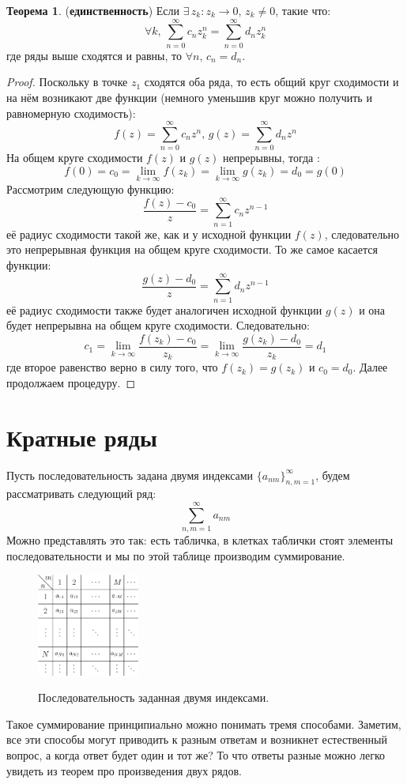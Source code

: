 \documentclass[12pt]{article}
\theoremstyle{definition}
\newtheorem{theorem}{Теорема}
\newcommand{\ddsum}[2]{\displaystyle\sum\limits_{#1}^{#2}}
\begin{document}
\begin{theorem}(\textbf{единственность})
	Если $\exists \, z_k \colon  z_k \to 0, \, z_k \neq 0$, такие что:
	$$
		\forall k, \, \ddsum{n = 0}{\infty}c_n z_k^n = \ddsum{n = 0}{\infty}d_n z_k^n
	$$ 
	где ряды выше сходятся и равны, то $\forall n, \, c_n = d_n$.
\end{theorem}
\begin{proof}
	Поскольку в точке $z_1$ сходятся оба ряда, то есть общий круг сходимости и на нём возникают две функции (немного уменьшив круг можно получить и равномерную сходимость):
	$$
		f(z) = \ddsum{n = 0}{\infty}c_n z^n, \, g(z) = \ddsum{n = 0}{\infty}d_n z^n
	$$
	На общем круге сходимости $f(z)$ и $g(z)$ непрерывны, тогда : 
	$$
		f(0) = c_0 = \lim\limits_{k \to \infty}f(z_k) = \lim\limits_{k \to \infty}g(z_k) = d_0 = g(0)
	$$
	Рассмотрим следующую функцию:
	$$
		\dfrac{f(z) - c_0}{z} = \ddsum{n = 1}{\infty}c_nz^{n-1}
	$$ 
	её радиус сходимости такой же, как и у исходной функции $f(z)$, следовательно это непрерывная функция на общем круге сходимости. То же самое касается функции:
	$$
		\dfrac{g(z) - d_0}{z} = \ddsum{n = 1}{\infty}d_n z^{n-1}
	$$
	её радиус сходимости также будет аналогичен исходной функции $g(z)$ и она будет непрерывна на общем круге сходимости. Следовательно:
	$$
		c_1 = \lim\limits_{k \to \infty}\dfrac{f(z_k) - c_0}{z_k} = \lim\limits_{k \to \infty}\dfrac{g(z_k) - d_0}{z_k} = d_1
	$$
	где второе равенство верно в силу того, что $f(z_k) = g(z_k)$ и $c_0 = d_0$. Далее продолжаем процедуру. 
\end{proof}
\newpage
\section*{Кратные ряды}
Пусть последовательность задана двумя индексами $\{a_{nm}\}_{n,m = 1}^{\infty}$, будем рассматривать следующий ряд:
$$
	\ddsum{n,m = 1}{\infty}a_{nm}
$$
Можно представлять это так: есть табличка, в клетках таблички стоят элементы последовательности и мы по этой таблице производим суммирование.
\begin{figure}[H]
	\centering
	\includegraphics[width=0.3\textwidth]{MA3L16_1.eps}
	\label{MA3L16_1}
	\caption{Последовательность заданная двумя индексами.}
	\label{fig:построение h(x)}
\end{figure}
Такое суммирование принципиально можно понимать тремя способами. Заметим, все эти способы могут приводить к разным ответам и возникнет естественный вопрос, а когда ответ будет один и тот же? То что ответы разные можно легко увидеть из теорем про произведения двух рядов.
\end{document}

